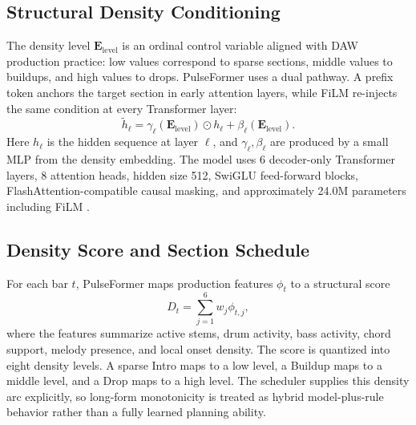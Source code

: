 \documentclass[conference]{conference-latex-template_10-17-19/IEEEtran}
\begin{document}
\begin{table}[t]
\caption{Compound-token vocabulary used by PulseFormer}
\label{tab:vocab}
\centering\small
{}
\end{table}

\subsection{Structural Density Conditioning}
The density level $\mathbf{E}_{\mathrm{level}}$ is an ordinal control variable aligned with DAW production practice: low values correspond to sparse sections, middle values to buildups, and high values to drops. PulseFormer uses a dual pathway. A prefix token anchors the target section in early attention layers, while FiLM re-injects the same condition at every Transformer layer:
\begin{equation}
\tilde{h}_{\ell}=
\gamma_{\ell}(\mathbf{E}_{\mathrm{level}})\odot h_{\ell}+
\beta_{\ell}(\mathbf{E}_{\mathrm{level}}).
\end{equation}
Here $h_{\ell}$ is the hidden sequence at layer $\ell$, and $\gamma_{\ell},\beta_{\ell}$ are produced by a small MLP from the density embedding. The model uses 6 decoder-only Transformer layers, 8 attention heads, hidden size 512, SwiGLU feed-forward blocks, FlashAttention-compatible causal masking, and approximately 24.0M parameters including FiLM \cite{dao2022flashattention}.

\subsection{Density Score and Section Schedule}
For each bar $t$, PulseFormer maps production features $\phi_t$ to a structural score
\begin{equation}
D_t=\sum_{j=1}^{6}w_j\phi_{t,j},
\end{equation}
where the features summarize active stems, drum activity, bass activity, chord support, melody presence, and local onset density. The score is quantized into eight density levels. A sparse Intro maps to a low level, a Buildup maps to a middle level, and a Drop maps to a high level. The scheduler supplies this density arc explicitly, so long-form monotonicity is treated as hybrid model-plus-rule behavior rather than a fully learned planning ability.
\end{document}
